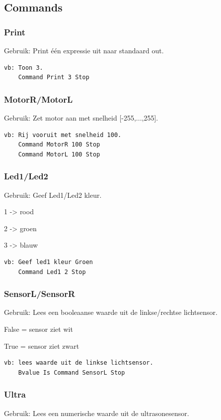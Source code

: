 \documentclass[a4paper,10pt]{article}
\begin{document}
  \subsection{Commands}
    \subsubsection{Print}
      Gebruik: Print één expressie uit naar standaard out.
      \begin{lstlisting}[language=Alphi]
vb: Toon 3.
    Command Print 3 Stop
      \end{lstlisting}
    \subsubsection{MotorR/MotorL}
      Gebruik: Zet motor aan met snelheid [-255,...,255].
      \begin{lstlisting}[language=Alphi]
vb: Rij vooruit met snelheid 100.
    Command MotorR 100 Stop
    Command MotorL 100 Stop
      \end{lstlisting}
    \subsubsection{Led1/Led2}
      Gebruik: Geef Led1/Led2 kleur.
      
      1 -> rood
      
      2 -> groen
      
      3 -> blauw
      
      \begin{lstlisting}[language=Alphi]
vb: Geef led1 kleur Groen
    Command Led1 2 Stop
      \end{lstlisting}
    \subsubsection{SensorL/SensorR}
      Gebruik: Lees een booleaanse waarde uit de linkse/rechtse lichtsensor.
      
      False = sensor ziet wit
      
      True  = sensor ziet zwart
      
      \begin{lstlisting}[language=Alphi]
vb: lees waarde uit de linkse lichtsensor.
    Bvalue Is Command SensorL Stop
      \end{lstlisting}
    \subsubsection{Ultra}
      Gebruik: Lees een numerische waarde uit de ultrasonesensor.
      
\end{document}
